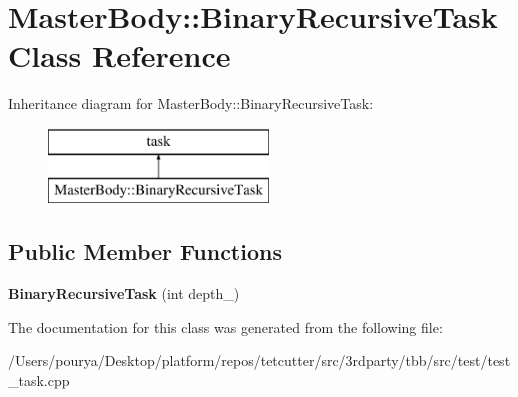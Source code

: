 \hypertarget{classMasterBody_1_1BinaryRecursiveTask}{}\section{Master\+Body\+:\+:Binary\+Recursive\+Task Class Reference}
\label{classMasterBody_1_1BinaryRecursiveTask}
Inheritance diagram for Master\+Body\+:\+:Binary\+Recursive\+Task\+:\begin{figure}[H]
\begin{center}
\leavevmode
\includegraphics[height=2.000000cm]{classMasterBody_1_1BinaryRecursiveTask}
\end{center}
\end{figure}
\subsection*{Public Member Functions}
\begin{DoxyCompactItemize}
\item 
\hypertarget{classMasterBody_1_1BinaryRecursiveTask_a5cf783230fd67dc10bed7c3cb933c056}{}{\bfseries Binary\+Recursive\+Task} (int depth\+\_\+)\label{classMasterBody_1_1BinaryRecursiveTask_a5cf783230fd67dc10bed7c3cb933c056}

\end{DoxyCompactItemize}


The documentation for this class was generated from the following file\+:\begin{DoxyCompactItemize}
\item 
/\+Users/pourya/\+Desktop/platform/repos/tetcutter/src/3rdparty/tbb/src/test/test\+\_\+task.\+cpp\end{DoxyCompactItemize}
